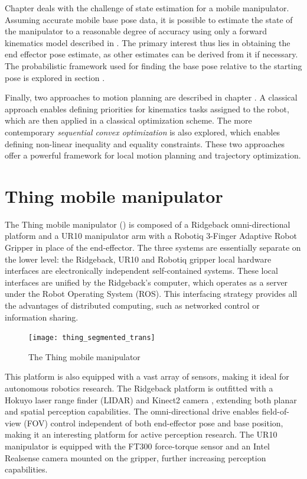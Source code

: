 \documentclass[times, utf8, diplomski, english]{fer}
\begin{document}
Chapter  deals with the challenge of state estimation for a mobile manipulator.
Assuming accurate mobile base pose data, it is possible to estimate the state of the manipulator to a reasonable degree of accuracy using only a forward kinematics model described in .
The primary interest thus lies in obtaining the end effector pose estimate, as other estimates can be derived from it if necessary.
The probabilistic framework used for finding the base pose relative to the starting pose is explored in section .

Finally, two approaches to motion planning are described in chapter .
A classical approach enables defining priorities for kinematics tasks assigned to the robot, which are then applied in a classical optimization scheme.
The more contemporary \textit{sequential convex optimization} is also explored, which enables defining non-linear inequality and equality constraints.
These two approaches offer a powerful framework for local motion planning and trajectory optimization.

\chapter{Thing mobile manipulator}\label{chapter:thing}
The Thing mobile manipulator () is composed of a Ridgeback omni-directional platform and a UR10 manipulator arm with a Robotiq 3-Finger Adaptive Robot Gripper in place of the end-effector.
The three systems are essentially separate on the lower level: the Ridgeback, UR10 and Robotiq gripper local hardware interfaces are electronically independent self-contained systems.
These local interfaces are unified by the Ridgeback's computer, which operates as a server under the Robot Operating System (ROS).
This interfacing strategy provides all the advantages of distributed computing, such as networked control or information sharing.
\begin{figure}[h]
\centering
\texttt{[image: thing\_segmented\_trans]}
\caption{The Thing mobile manipulator}
\label{figure:thing}
\end{figure}
This platform is also equipped with a vast array of sensors, making it ideal for autonomous robotics research.
The Ridgeback platform is outfitted with a Hokuyo laser range finder (LIDAR) and Kinect2 camera , extending both planar and spatial perception capabilities.
The omni-directional drive enables field-of-view (FOV) control independent of both end-effector pose and base position, making it an interesting platform for active perception research.
The UR10 manipulator is equipped with the FT300 force-torque sensor and an Intel Realsense camera mounted on the gripper, further increasing perception capabilities.
\end{document}
